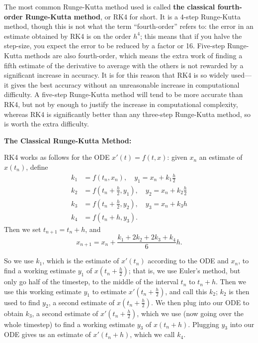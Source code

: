\documentclass{article}
\begin{document}
The most common Runge-Kutta method used is called \textbf{the classical fourth-order Runge-Kutta method}, or RK4 for short. It is a 4-step Runge-Kutta method, though this is not what the term ``fourth-order'' refers to: the error in an estimate obtained by RK4 is on the order $h^4$; this means that if you halve the step-size, you expect the error to be reduced by a factor or 16. Five-step Runge-Kutta methods are also fourth-order, which means the extra work of finding a fifth estimate of the derivative to average with the others is not rewarded by a significant increase in accuracy. It is for this reason that RK4 is so widely used---it gives the best accuracy without an unreasonable increase in computational difficulty. A five-step Runge-Kutta method will tend to be more accurate than RK4, but not by enough to justify the increase in computational complexity, whereas RK4 is significantly better than any three-step Runge-Kutta method, so is worth the extra difficulty.


\clearpage



\textbf{The Classical Runge-Kutta Method:}\bigskip


RK4 works as follows for the ODE $x'(t)=f(t,x)$: given $x_n$ an estimate of $x(t_n)$, define
\begin{align*}
	k_1 &= f(t_n,x_n),\quad y_1=x_n+k_1\frac{h}{2}\\
	k_2&=f\left(t_n+\frac{h}{2},y_1\right),\quad y_2=x_n+k_2\frac{h}{2}\\
	k_3&=f\left(t_n+\frac{h}{2},y_2\right),\quad y_3=x_n+k_3h\\
	k_4&=f(t_n+h,y_3).
\end{align*}
Then we set $t_{n+1}=t_n+h$, and
\[x_{n+1}=x_n + \frac{k_1+2k_2+2k_3+k_4}{6}h.\]

So we use $k_1$, which is the estimate of $x'(t_n)$ according to the ODE and $x_n$, to find a working estimate $y_1$ of $x\left(t_n+\frac{h}{2}\right)$; that is, we use Euler's method, but only go half of the timestep, to the middle of the interval $t_n$ to $t_n+h$. Then we use this working estimate $y_1$ to estimate $x'\left(t_n+\frac{h}{2}\right)$, and call this $k_2$; $k_2$ is then used to find $y_2$, a second estimate of $x\left(t_n+\frac{h}{2}\right)$. We then plug into our ODE to obtain $k_3$, a second estimate of $x'\left(t_n+\frac{h}{2}\right)$, which we use (now going over the whole timestep) to find a working estimate $y_3$ of $x(t_n+h)$. Plugging $y_3$ into our ODE gives us an estimate of $x'(t_n+h)$, which we call $k_4$.
\end{document}
